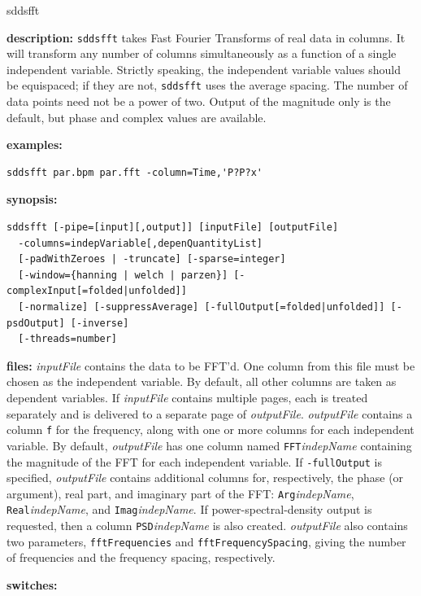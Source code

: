 \begin{sddsprog}{sddsfft}
  \item \textbf{description:} \verb|sddsfft| takes Fast Fourier Transforms of real data in columns. It will transform any number of columns simultaneously as a function of a single independent variable. Strictly speaking, the independent variable values should be equispaced; if they are not, \verb|sddsfft| uses the average spacing. The number of data points need not be a power of two. Output of the magnitude only is the default, but phase and complex values are available.
  \item \textbf{examples:}
    \begin{verbatim}
sddsfft par.bpm par.fft -column=Time,'P?P?x'
    \end{verbatim}
  \item \textbf{synopsis:}
    \begin{verbatim}
sddsfft [-pipe=[input][,output]] [inputFile] [outputFile]
  -columns=indepVariable[,depenQuantityList]
  [-padWithZeroes | -truncate] [-sparse=integer]
  [-window={hanning | welch | parzen}] [-complexInput[=folded|unfolded]]
  [-normalize] [-suppressAverage] [-fullOutput[=folded|unfolded]] [-psdOutput] [-inverse]
  [-threads=number]
    \end{verbatim}
  \item \textbf{files:} \emph{inputFile} contains the data to be FFT'd. One column from this file must be chosen as the independent variable. By default, all other columns are taken as dependent variables. If \emph{inputFile} contains multiple pages, each is treated separately and is delivered to a separate page of \emph{outputFile}. \emph{outputFile} contains a column \verb|f| for the frequency, along with one or more columns for each independent variable. By default, \emph{outputFile} has one column named \verb|FFT|\emph{indepName} containing the magnitude of the FFT for each independent variable. If \verb|-fullOutput| is specified, \emph{outputFile} contains additional columns for, respectively, the phase (or argument), real part, and imaginary part of the FFT: \verb|Arg|\emph{indepName}, \verb|Real|\emph{indepName}, and \verb|Imag|\emph{indepName}. If power-spectral-density output is requested, then a column \verb|PSD|\emph{indepName} is also created. \emph{outputFile} also contains two parameters, \verb|fftFrequencies| and \verb|fftFrequencySpacing|, giving the number of frequencies and the frequency spacing, respectively.
  \item \textbf{switches:}
    \begin{itemize}

\end{itemize}
\end{sddsprog}
